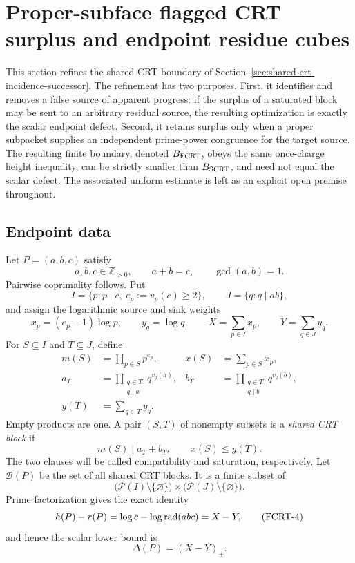 \section{Proper-subface flagged CRT surplus and endpoint residue cubes}
\label{sec:flagged-crt-residue-cube}

This section refines the shared-CRT boundary of
Section~\ref{sec:shared-crt-incidence-successor}.  The refinement has two
purposes.  First, it identifies and removes a false source of apparent
progress: if the surplus of a saturated block may be sent to an arbitrary
residual source, the resulting optimization is exactly the scalar endpoint
defect.  Second, it retains surplus only when a proper subpacket supplies an
independent prime-power congruence for the target source.  The resulting
finite boundary, denoted $B_{\rm FCRT}$, obeys the same once-charge height
inequality, can be strictly smaller than $B_{\rm SCRT}$, and need not equal
the scalar defect.  The associated uniform estimate is left as an explicit
open premise throughout.

\subsection{Endpoint data}

Let $P=(a,b,c)$ satisfy
\[
 a,b,c\in\mathbb Z_{>0},\qquad a+b=c,\qquad \gcd(a,b)=1.
\]
Pairwise coprimality follows.  Put
\[
 I=\{p:p\mid c,\ e_p:=v_p(c)\ge 2\},\qquad
 J=\{q:q\mid ab\},
\]
and assign the logarithmic source and sink weights
\[
 x_p=(e_p-1)\log p,\qquad y_q=\log q,
 \qquad X=\sum_{p\in I}x_p,
 \qquad Y=\sum_{q\in J}y_q.
\tag{FCRT-1}\label{eq:fcrt-endpoint-data}
\]
For $S\subseteq I$ and $T\subseteq J$, define
\[
 \begin{aligned}
 m(S)&=\prod_{p\in S}p^{e_p},
 &x(S)&=\sum_{p\in S}x_p,\\
 a_T&=\prod_{\substack{q\in T\\q\mid a}}q^{v_q(a)},
 &b_T&=\prod_{\substack{q\in T\\q\mid b}}q^{v_q(b)},\\
 y(T)&=\sum_{q\in T}y_q.
 \end{aligned}
\tag{FCRT-2}\label{eq:fcrt-packets}
\]
Empty products are one.  A pair $(S,T)$ of nonempty subsets is a
\emph{shared CRT block} if
\[
                 m(S)\mid a_T+b_T,
 \qquad           x(S)\le y(T).
\tag{FCRT-3}\label{eq:fcrt-block}
\]
The two clauses will be called compatibility and saturation, respectively.
Let $\mathcal B(P)$ be the set of all shared CRT blocks.  It is a finite
subset of
\[
 \bigl(\mathcal P(I)\setminus\{\varnothing\}\bigr)
 \times
 \bigl(\mathcal P(J)\setminus\{\varnothing\}\bigr).
\]
Prime factorization gives the exact identity
\[
 h(P)-r(P)
 =\log c-\log\operatorname{rad}(abc)=X-Y,
\tag{FCRT-4}\label{eq:fcrt-endpoint-identity}
\]
and hence the scalar lower bound is
\[
                         \Delta(P)=(X-Y)_+.
\]

